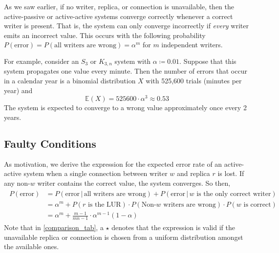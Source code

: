 \documentclass[12pt]{article}
\newcommand{\E}{\ensuremath{\mathbb{E}}}
\newcommand{\given}{\,|\,}
\begin{document}
As we saw earlier, if no writer, replica, or connection is unavailable, then the active-passive or active-active systems converge correctly whenever a correct writer is present. That is, the system can only converge incorrectly if \emph{every} writer emits an incorrect value. This occurs with the following probability \(P(\text{error}) = P(\text{all writers are wrong}) = \alpha^m\) for \(m\) independent writers.

For example, consider an \(S_3\) or \(K_{3, n}\) system with \(\alpha \coloneqq 0.01\). Suppose that this system propagates one value every minute. Then the number of errors that occur in a calendar year is a binomial distribution \(X\) with 525,600 trials (minutes per year) and
\begin{equation}
	\E(X) = 525600 \cdot \alpha^3 \approx 0.53
\end{equation}
The system is expected to converge to a wrong value approximately once every 2 years.

\subsection{Faulty Conditions} \label{faulty_cond}

As motivation, we derive the expression for the expected error rate of an active-active system when a single connection between writer \(w\) and replica \(r\) is lost. If any non-\(w\) writer contains the correct value, the system converges. So then,
\begin{align}
\begin{split}
	P(\text{error}) &= P(\text{error} \given \text{all writers are wrong}) + P(\text{error} \given w \text{ is the only correct writer}) \\
	&= \alpha^m +  P(r \text{ is the LUR}) \cdot P(\text{Non-}w \text{ writers are wrong}) \cdot P(w \text{ is correct}) \\
	&= \alpha^m + \frac{m - 1}{mn - 1} \cdot \alpha^{m - 1} (1 - \alpha)
\end{split}
\end{align}
Note that in \cref{comparison_tab}, a \(\star\) denotes that the expression is valid if the unavailable replica or connection is chosen from a uniform distribution amongst the available ones.
\end{document}
